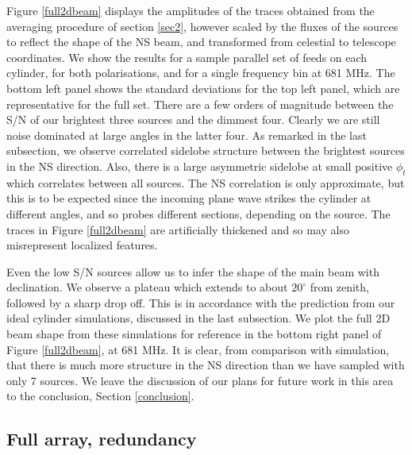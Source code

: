 Figure \ref{full2dbeam} displays the amplitudes of the traces obtained from the averaging procedure of section \ref{sec2}, however scaled by the fluxes of the sources to reflect the shape of the NS beam, and transformed from celestial to telescope coordinates. We show the results for a sample parallel set of feeds on each cylinder, for both polarisations, and for a single frequency bin at 681 MHz. The bottom left panel shows the standard deviations for the top left panel, which are representative for the full set. There are a few orders of magnitude between the S/N of our brightest three sources and the dimmest four. Clearly we are still noise dominated at large angles in the latter four. As remarked in the last subsection, we observe correlated sidelobe structure between the brightest sources in the NS direction. Also, there is a large asymmetric sidelobe at small positive $\phi_t$ which correlates between all sources. The NS correlation is only approximate, but this is to be expected since the incoming plane wave strikes the cylinder at different angles, and so probes different sections, depending on the source. The traces in Figure \ref{full2dbeam} are artificially thickened and so may also misrepresent localized features.

Even the low S/N sources allow us to infer the shape of the main beam with declination. We observe a plateau which extends to about $20^{\circ}$ from zenith, followed by a sharp drop off. This is in accordance with the prediction from our ideal cylinder simulations, discussed in the last subsection. We plot the full 2D beam shape from these simulations for reference in the bottom right panel of Figure \ref{full2dbeam}, at 681 MHz. It is clear, from comparison with simulation, that there is much more structure in the NS direction than we have sampled with only 7 sources. We leave the discussion of our plans for future work in this area to the conclusion, Section \ref{conclusion}.

\subsection{Full array, redundancy} \label{fullarraysec}

